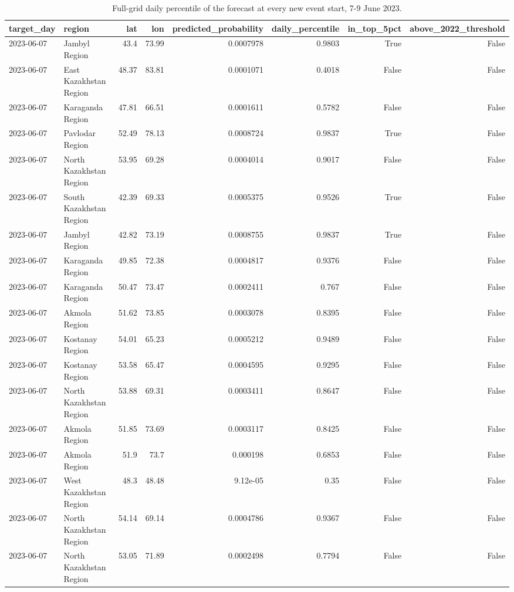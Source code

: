 \begin{table}
\caption{Full-grid daily percentile of the forecast at every new event start, 7-9 June 2023.}
\label{tab:T15_case_june_2023_starts}
\begin{tabular}{llrrrrrr}
\toprule
target_day & region & lat & lon & predicted_probability & daily_percentile & in_top_5pct & above_2022_threshold \\
\midrule
2023-06-07 & Jambyl Region & 43.4 & 73.99 & 0.0007978 & 0.9803 & True & False \\
2023-06-07 & East Kazakhstan Region & 48.37 & 83.81 & 0.0001071 & 0.4018 & False & False \\
2023-06-07 & Karaganda Region & 47.81 & 66.51 & 0.0001611 & 0.5782 & False & False \\
2023-06-07 & Pavlodar Region & 52.49 & 78.13 & 0.0008724 & 0.9837 & True & False \\
2023-06-07 & North Kazakhstan Region & 53.95 & 69.28 & 0.0004014 & 0.9017 & False & False \\
2023-06-07 & South Kazakhstan Region & 42.39 & 69.33 & 0.0005375 & 0.9526 & True & False \\
2023-06-07 & Jambyl Region & 42.82 & 73.19 & 0.0008755 & 0.9837 & True & False \\
2023-06-07 & Karaganda Region & 49.85 & 72.38 & 0.0004817 & 0.9376 & False & False \\
2023-06-07 & Karaganda Region & 50.47 & 73.47 & 0.0002411 & 0.767 & False & False \\
2023-06-07 & Akmola Region & 51.62 & 73.85 & 0.0003078 & 0.8395 & False & False \\
2023-06-07 & Kostanay Region & 54.01 & 65.23 & 0.0005212 & 0.9489 & False & False \\
2023-06-07 & Kostanay Region & 53.58 & 65.47 & 0.0004595 & 0.9295 & False & False \\
2023-06-07 & North Kazakhstan Region & 53.88 & 69.31 & 0.0003411 & 0.8647 & False & False \\
2023-06-07 & Akmola Region & 51.85 & 73.69 & 0.0003117 & 0.8425 & False & False \\
2023-06-07 & Akmola Region & 51.9 & 73.7 & 0.000198 & 0.6853 & False & False \\
2023-06-07 & West Kazakhstan Region & 48.3 & 48.48 & 9.12e-05 & 0.35 & False & False \\
2023-06-07 & North Kazakhstan Region & 54.14 & 69.14 & 0.0004786 & 0.9367 & False & False \\
2023-06-07 & North Kazakhstan Region & 53.05 & 71.89 & 0.0002498 & 0.7794 & False & False \\

\end{tabular}
\end{table}
